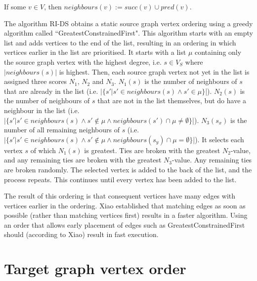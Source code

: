 \begin{defn}
If some $v\in V$, then $\mathit{neighbours}(v):= \mathit{succ}(v) \cup \mathit{pred}(v)$.
\end{defn}



The algorithm RI-DS obtains a static source graph vertex ordering using a greedy algorithm called ``GreatestConstrainedFirst". This algorithm starts with an empty list and adds vertices to the end of the list, resulting in an ordering in which vertices earlier in the list are prioritised. It starts with a list $\mu$ containing only the source graph vertex with the highest degree, i.e. $s\in V_S$ where $|\mathit{neighbours}(s)|$ is highest. Then, each source graph vertex not yet in the list is assigned three scores $N_1$, $N_2$ and $N_3$. $N_1(s)$ is the number of neighbours of $s$ that are already in the list (i.e. $|\{s' | s' \in \mathit{neighbours}(s) \land s' \in \mu\}$|). $N_2(s)$ is the number of neighbours of $s$ that are not in the list themselves, but do have a neighbour in the list (i.e. $|\{s' | s' \in \mathit{neighbours}(s) \land s' \not \in \mu \land \mathit{neighbours}(s') \cap \mu \neq \emptyset\}$|). $N_3(s_x)$ is the number of all remaining neighbours of $s$ (i.e. $|\{s' | s' \in \mathit{neighbours}(s) \land s' \not \in \mu \land \mathit{neighbours}(s_y) \cap \mu = \emptyset\}$|). It selects each vertex $s$ of which $N_1(s)$ is greatest. Ties are broken with the greatest $N_2$-value, and any remaining ties are broken with the greatest $N_3$-value. Any remaining ties are broken randomly. The selected vertex is added to the back of the list, and the process repeats. This continues until every vertex has been added to the list.

The result of this ordering is that consequent vertices have many edges with vertices earlier in the ordering. Xiao established that matching edges as soon as possible (rather than matching vertices first) results in a faster algorithm. Using an order that allows early placement of edges such as GreatestConstrainedFirst should (according to Xiao) result in fast execution.
\section{Target graph vertex order}
\label{sec:targetOrder}

